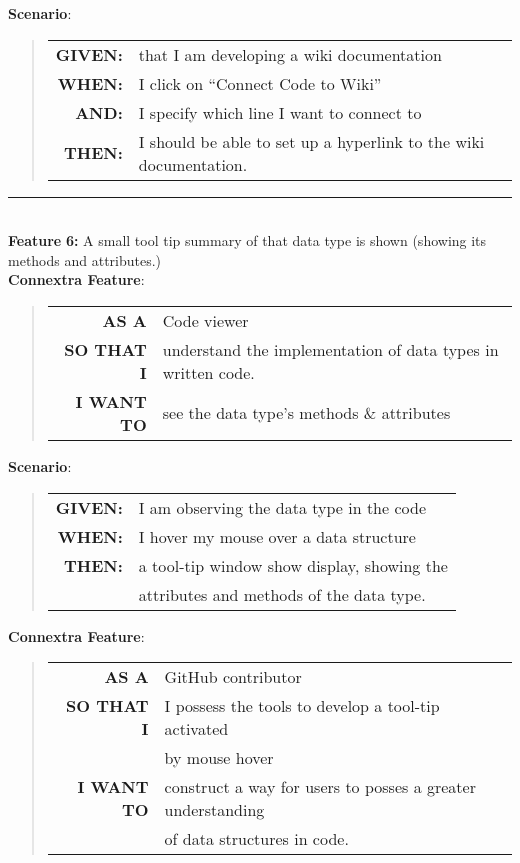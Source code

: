 \documentclass[12pt]{article}
\newcommand{\Feature}[1]{ 
   \noindent \textbf{Feature} #1
}
\newcommand{\GivenSc} {
	\noindent \textbf{GIVEN:}
	}
\newcommand{\WhenSc} {
	\noindent \textbf{WHEN:}
	}
\newcommand{\AndSc} {
	\noindent \textbf{AND:}
	}
\newcommand{\ThenSc} {
	\noindent \textbf{THEN:}
	}
\begin{document}
\begin{framed}
\noindent \textbf{Scenario}:
\begin{quote}
\begin{tabular}{rl}
\GivenSc & that I am developing a wiki documentation\\
\WhenSc & I click on ``Connect Code to Wiki''\\
\AndSc & I specify which line I want to connect to\\
\ThenSc & I should be able to set up a hyperlink to the wiki documentation.
\end{tabular}
\end{quote}

\hrule~\\

\noindent \Feature{\textbf{6:} A small tool tip summary of that data type is shown (showing its methods and attributes.)}\\[0.2cm]

\noindent \textbf{Connextra Feature}:
\begin{quote}
\begin{tabular}{rl}
\textbf{AS A}      & Code viewer\\
\textbf{SO THAT I} & understand the implementation of data types in written code.\\
\textbf{I WANT TO} & see the data type's methods \& attributes
\end{tabular}
\end{quote}

\pagebreak
\noindent \textbf{Scenario}:
\begin{quote}
\begin{tabular}{rl}
\GivenSc & I am observing the data type in the code\\
\WhenSc & I hover my mouse over a data structure\\
\ThenSc & a tool-tip window show display, showing the \\ 
        & attributes and methods of the data type.
\end{tabular}
\end{quote}

\noindent \textbf{Connextra Feature}:
\begin{quote}
\begin{tabular}{rl}
\textbf{AS A}      & \textsf{GitHub} contributor\\
\textbf{SO THAT I} & I possess the tools to develop a tool-tip activated \\                    
                   & by mouse hover\\
\textbf{I WANT TO} & construct a way for users to posses a greater understanding \\
                   & of data structures in code.
\end{tabular}
\end{quote}


\end{framed}
\end{document}
